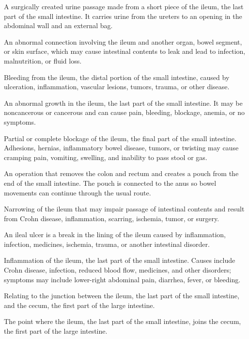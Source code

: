  A surgically created urine passage made from a short piece of the ileum, the last part of the small intestine. It carries urine from the ureters to an opening in the abdominal wall and an external bag.

 An abnormal connection involving the ileum and another organ, bowel segment, or skin surface, which may cause intestinal contents to leak and lead to infection, malnutrition, or fluid loss.

 Bleeding from the ileum, the distal portion of the small intestine, caused by ulceration, inflammation, vascular lesions, tumors, trauma, or other disease.

 An abnormal growth in the ileum, the last part of the small intestine. It may be noncancerous or cancerous and can cause pain, bleeding, blockage, anemia, or no symptoms.

 Partial or complete blockage of the ileum, the final part of the small intestine. Adhesions, hernias, inflammatory bowel disease, tumors, or twisting may cause cramping pain, vomiting, swelling, and inability to pass stool or gas.

 An operation that removes the colon and rectum and creates a pouch from the end of the small intestine. The pouch is connected to the anus so bowel movements can continue through the usual route.

 Narrowing of the ileum that may impair passage of intestinal contents and result from Crohn disease, inflammation, scarring, ischemia, tumor, or surgery.

 An ileal ulcer is a break in the lining of the ileum caused by inflammation, infection, medicines, ischemia, trauma, or another intestinal disorder.

 Inflammation of the ileum, the last part of the small intestine. Causes include Crohn disease, infection, reduced blood flow, medicines, and other disorders; symptoms may include lower-right abdominal pain, diarrhea, fever, or bleeding.

 Relating to the junction between the ileum, the last part of the small intestine, and the cecum, the first part of the large intestine.

 The point where the ileum, the last part of the small intestine, joins the cecum, the first part of the large intestine.

